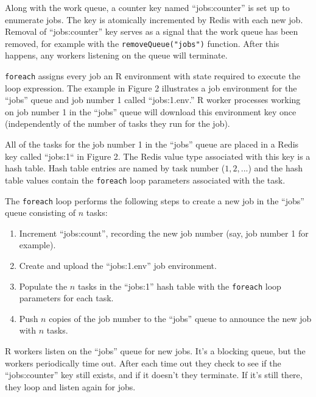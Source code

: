 \documentclass[12pt]{article}
\begin{document}
Along with the work queue, a counter key named ``jobs:counter'' is set up to
enumerate jobs. The key is atomically incremented by Redis with each new job.
Removal of ``jobs:counter'' key serves as a signal that the work queue has been
removed, for example with the \verb+removeQueue("jobs")+ function. After this
happens, any workers listening on the queue will terminate.

\verb+foreach+ assigns every job an R environment with state required to
execute the loop expression. The example in Figure 2 illustrates a job
environment for the ``jobs'' queue and job number 1 called ``jobs:1.env.'' R
worker processes working on job number 1 in the ``jobs'' queue will download
this environment key once (independently of the number of tasks they run for
the job).

All of the tasks for the job number 1 in the ``jobs'' queue are placed in a
Redis key called ``jobs:1`` in Figure 2. The Redis value type associated with
this key is a hash table. Hash table entries are named by task number ($1, 2,
...$) and the hash table values contain the \verb+foreach+ loop parameters
associated with the task.

The \verb+foreach+ loop performs the following steps to create a new job
in the ``jobs'' queue consisting of $n$ tasks:
\begin{enumerate}
\item Increment ``jobs:count'', recording the new job number
       (say, job number 1 for example).
\item Create and upload the  ``jobs:1.env'' job environment.
\item Populate the $n$ tasks in the ``jobs:1'' hash table with the
      \verb+foreach+ loop parameters for each task.
\item Push $n$ copies of the job number to the ``jobs'' queue to announce
  the new job with $n$ tasks.
\end{enumerate}

R workers listen on the ``jobs'' queue for new jobs. It's a blocking queue, but
the workers periodically time out. After each time out they check to see if the
``jobs:counter'' key still exists, and if it doesn't they terminate. If it's
still there, they loop and listen again for jobs.
\end{document}
